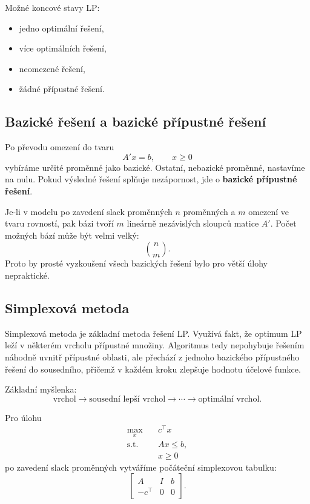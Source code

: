 Možné koncové stavy LP:
\begin{itemize}
    \item jedno optimální řešení,
    \item více optimálních řešení,
    \item neomezené řešení,
    \item žádné přípustné řešení.
\end{itemize}

\subsection{Bazické řešení a bazické přípustné řešení}

Po převodu omezení do tvaru
\[
A'x=b,\qquad x\ge 0
\]
vybíráme určité proměnné jako bazické. Ostatní, nebazické proměnné, nastavíme na nulu.
Pokud výsledné řešení splňuje nezápornost, jde o \textbf{bazické přípustné řešení}.

Je-li v modelu po zavedení slack proměnných $n$ proměnných a $m$ omezení ve tvaru rovností,
pak bázi tvoří $m$ lineárně nezávislých sloupců matice $A'$. Počet možných bází může být velmi
velký:
\[
\binom{n}{m}.
\]
Proto by prosté vyzkoušení všech bazických řešení bylo pro větší úlohy nepraktické.

\subsection{Simplexová metoda}

Simplexová metoda je základní metoda řešení LP. Využívá fakt, že optimum LP leží v některém
vrcholu přípustné množiny. Algoritmus tedy nepohybuje řešením náhodně uvnitř přípustné oblasti,
ale přechází z jednoho bazického přípustného řešení do sousedního, přičemž v každém kroku zlepšuje
hodnotu účelové funkce.

Základní myšlenka:
\[
\text{vrchol}
\rightarrow
\text{sousední lepší vrchol}
\rightarrow
\cdots
\rightarrow
\text{optimální vrchol}.
\]

Pro úlohu
\[
\begin{aligned}
\max_x \quad & c^\top x\\
\text{s.t.}\quad & Ax\le b,\\
& x\ge 0
\end{aligned}
\]
po zavedení slack proměnných vytváříme počáteční simplexovou tabulku:
\[
\left[
\begin{array}{ccc}
A & I & b\\
-c^\top & 0 & 0
\end{array}
\right].
\]

